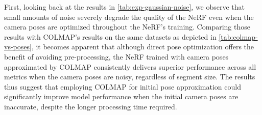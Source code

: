 \begin{comment}
\begin{table}[ht]
\centering
\setlength{\tabcolsep}{6pt}
\renewcommand{\arraystretch}{1.5}
\begin{tabular}{l | C{2.2} C{1.3} C{1.3} c}
\hline
\textbf{Description} & \textbf{PSNR $\uparrow$} & \textbf{SSIM $\uparrow$} & \textbf{LPIPS $\downarrow$} & \textbf{Time processing} \\
\hline
\multicolumn{5}{c}{Baseline segment} \\
\hline
CARLA w/o camera optimization & \cellcolor{green} 24.702831268310547 & \cellcolor{green} 0.7926456332206726 & \cellcolor{red} 0.17928948998451233  & 00:00:00 \\
CARLA w/ camera optimization & 24.197817 & 0.766733 & 0.168807 & 00:00:00 \\%
COLMAP & \cellcolor{red} 24.18618 & \cellcolor{red} 0.758549 & \cellcolor{green} 0.159935 & 01:12:15 \\%
\hline
\multicolumn{5}{c}{Shorter segment - 10\% of baseline} \\
\hline
CARLA w/o camera optimization &\cellcolor{green} 25.677803 & \cellcolor{green} 0.861634 & \cellcolor{green} 0.076989  & 00:00:00 \\
CARLA w/ camera optimization &\cellcolor{red} 24.831890 &\cellcolor{red} 0.824606 &\cellcolor{red} 0.102266 & 00:00:00 \\
COLMAP & 25.227386 & 0.8273112 & 0.0932542 & 00:02:00 \\
\hline
\end{tabular}
\caption{Results for experiments}
\label{tab:colmap-vs-poses}
\end{table}
\end{comment}


First, looking back at the results in \autoref{tab:exp-gaussian-noise}, we observe that small amounts of noise severely degrade the quality of the NeRF even when the camera poses are optimized throughout the NeRF's training. Comparing those results with COLMAP's results on the same datasets as depicted in \autoref{tab:colmap-vs-poses}, it becomes apparent that although direct pose optimization offers the benefit of avoiding pre-processing, the NeRF trained with camera poses approximated by COLMAP consistently delivers superior performance across all metrics when the camera poses are noisy, regardless of segment size. The results thus suggest that employing COLMAP for initial pose approximation could significantly improve model performance when the initial camera poses are inaccurate, despite the longer processing time required.


